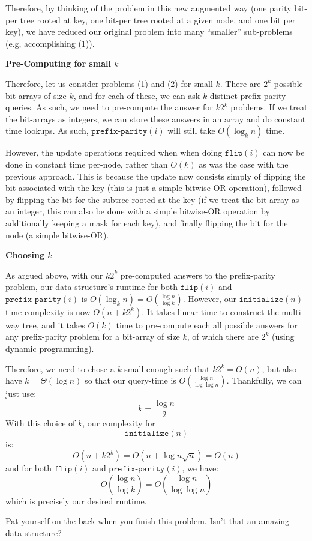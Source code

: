 \documentclass[12pt]{exam}
\newcommand*{\bigtheta}[1]{\Theta\left( #1 \right)}
\newcommand*{\bigo}[1]{O\left( #1 \right)}
\begin{document}
\begin{questions}
\begin{parts}
\begin{solution}
Therefore, by thinking of the problem in this new augmented way (one parity bit-per tree rooted at key, one bit-per tree rooted at a given node, and one bit per key), we have reduced our original problem into many ``smaller'' sub-problems (e.g, accomplishing (1)).

\textbf{Pre-Computing for small $k$}

Therefore, let us consider problems (1) and (2) for small $k$. There are $2^k$ possible bit-arrays of size $k$, and for each of these, we can ask $k$ distinct prefix-parity queries. As such, we need to pre-compute the answer for $k2^k$ problems. If we treat the bit-arrays as integers, we can store these answers in an array and do constant time lookups. As such, $\texttt{prefix-parity}(i)$ will still take $\bigo{\log_k n}$ time.


However, the update operations required when when doing $\texttt{flip}(i)$ can now be done in constant time per-node, rather than $\bigo{k}$ as was the case with the previous approach. This is because the update now consists simply of flipping the bit associated with the key (this is just a simple bitwise-OR operation), followed by flipping the bit for the subtree rooted at the key (if we treat the bit-array as an integer, this can also be done with a simple bitwise-OR operation by additionally keeping a mask for each key), and finally flipping the bit for the node (a simple bitwise-OR). 


\textbf{Choosing $k$}

As argued above, with our $k2^k$ pre-computed answers to the prefix-parity problem, our data structure's runtime for both $\texttt{flip}(i)$ and $\texttt{prefix-parity}(i)$ is $\bigo{ \log_k n} = \bigo{\frac{\log n}{\log k}}$. However, our $\texttt{initialize}(n)$ time-complexity is now $\bigo{n + k 2^k}$. It takes linear time to construct the multi-way tree, and it takes $\bigo{k}$ time to pre-compute each all possible answers for any prefix-parity problem for a bit-array of size $k$, of which there are $2^k$ (using dynamic programming).


Therefore, we need to chose a $k$ small enough such that $k 2^k = \bigo{n}$, but also have $k = \bigtheta{\log n}$ so that our query-time is $\bigo{\frac{\log n}{ \log \log n}}$. Thankfully, we can just use:
$$
k = \frac{\log n }{ 2}
$$
With this choice of $k$, our complexity for $$\texttt{initialize}(n)$$ is:
$$
  \bigo{n + k 2^k} = \bigo{n + \log n \sqrt{n}} = \bigo{n}
$$
and for both $\texttt{flip}(i)$ and $\texttt{prefix-parity}(i)$, we have:
$$
\bigo{\frac{\log n}{\log k}} = \bigo{\frac{\log n} {\log \log n}}
$$
which is precisely our desired runtime.

\end{solution}
\end{parts}

Pat yourself on the back when you finish this problem. Isn't that an amazing data structure?

\end{questions}
\end{document}
